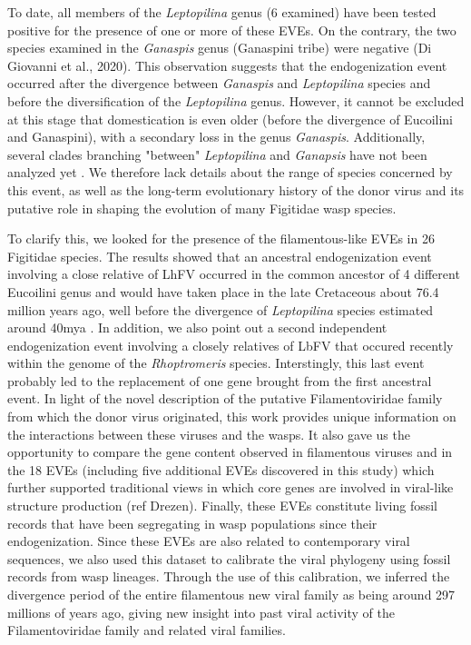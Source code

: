 To date, all members of the \textit{Leptopilina} genus (6 examined) have been tested positive for the presence of one or more of these EVEs. On the contrary, the two species examined in the \textit{Ganaspis} genus (Ganaspini tribe) were negative (Di Giovanni et al., 2020). 
 This observation suggests that the endogenization event occurred after the divergence between \textit{Ganaspis} and \textit{Leptopilina} species and before the diversification of the \textit{Leptopilina} genus. However, it cannot be excluded at this stage that domestication is even older (before the divergence of Eucoilini and Ganaspini), with a secondary loss in the genus \textit{Ganaspis}. Additionally, several clades branching "between" \textit{Leptopilina} and \textit{Ganapsis} have not been analyzed yet \citep{blaimer_comprehensive_2020}. We therefore lack details about the range of species concerned by this event, as well as the long-term evolutionary history of the donor virus and its putative role in shaping the evolution of many Figitidae wasp species. \newline 

To clarify this, we looked for the presence of the filamentous-like EVEs in 26 Figitidae species. The results showed that an ancestral endogenization event involving a close relative of LhFV occurred in the common ancestor of 4 different Eucoilini genus and would have taken place in the late Cretaceous about 76.4 million years ago, well before the divergence of \textit{Leptopilina} species estimated around 40mya \citep{blaimer_comprehensive_2020}. In addition, we also point out a second independent endogenization event involving a closely relatives of LbFV that occured recently within the genome of the \textit{Rhoptromeris} species. Interstingly, this last event probably led to the replacement of one gene brought from the first ancestral event.  In light of the novel description of the putative Filamentoviridae family from which the donor virus originated, this work provides unique information on the interactions between these viruses and the wasps. It also gave us the opportunity to compare the gene content observed in filamentous viruses and in the 18 EVEs (including five additional EVEs discovered in this study) which further supported traditional views in which core genes are involved in viral-like structure production (ref Drezen). Finally, these EVEs constitute living fossil records that have been segregating in wasp populations since their endogenization. Since these EVEs are also related to contemporary viral sequences, we also used this dataset to calibrate the viral phylogeny using fossil records from wasp lineages. Through the use of this calibration, we inferred the divergence period of the entire filamentous new viral family as being around 297 millions of years ago, giving new insight into past viral activity of the Filamentoviridae family and related viral families. 


